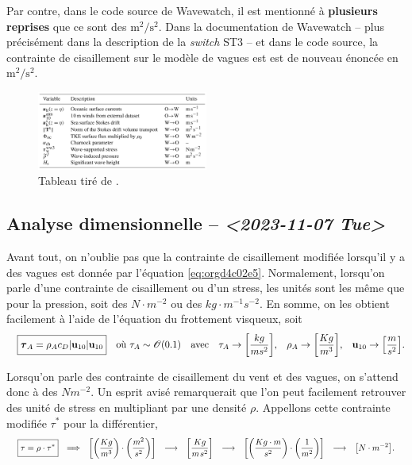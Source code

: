 \documentclass[10pt]{article}
\numberwithin{equation}{section}
\newcommand{\uu}{\vb{u}}
\newcommand{\tall}{\vphantom{pA^{x^x}_p}}
\newcommand{\pt}{\hspace{1pt}} %
\begin{document}
Par contre, dans le code source de Wavewatch, il est mentionné à \textbf{plusieurs reprises} que ce sont des \(\mathrm{m}^2/\mathrm{s}^2\).
Dans la documentation de Wavewatch -- plus précisément dans la description de la \emph{switch} ST3 -- et dans le code source, la contrainte de cisaillement sur le modèle de vagues est est de nouveau énoncée en \(\mathrm{m}^2/\mathrm{s}^2\).

\begin{figure}[ht]
\centering
\includegraphics[width=0.5\textwidth]{figures/articles/gmd-13-3067-2020-t01-web.png}
\caption{\label{fig:orgd2d9b57}Tableau tiré de \textcite{couvelard2020development}.}
\end{figure}


\subsection{Analyse dimensionnelle -- \textit{<2023-11-07 Tue>}}
\label{sec:org4b812a5}
\label{org28e3abc}

Avant tout, on n'oublie pas que la contrainte de cisaillement modifiée lorsqu'il y a des vagues est donnée par l'équation \ref{eq:orgd4c02e5}. 
Normalement, lorsqu'on parle d'une contrainte de cisaillement ou d'un stress, les unités sont les même que pour la pression, soit des \(N\cdot m^{-2}\) ou des \(kg\cdot m^{-1}s^{-2}\).
En somme, on les obtient facilement à l'aide de l'équation du frottement visqueux, soit
\begin{align}
   && \boxed{\boldsymbol{\tau}_{A} = \rho_A c_D \abs{\uu_{10}} \uu_{10}\tall }
   && \text{où}\  \tau_A \sim \mathscr{O}\qty(0.1)
   && \text{avec}
   && \tau_A \rightarrow \qty[\frac{kg}{ms^2}],
   && \rho_A \rightarrow \qty[\frac{Kg}{m^3}],
   && \uu_{10} \rightarrow \qty[\frac{m}{s^2}].
\end{align}

Lorsqu'on parle des contrainte de cisaillement du vent et des vagues, on s'attend donc à des \(N m^{-2}\).
Un esprit avisé remarquerait que l'on peut facilement retrouver des unité de stress en multipliant par une densité \(\rho\).
Appellons cette contrainte modifiée \(\tau^*\) pour la différentier,
\begin{align}
   && \boxed{\tau = \rho \cdot \tau^*\tall}
   &&\Longrightarrow
   &&\qty[\qty(\frac{Kg}{m^3})\cdot \qty(\frac{m^2}{s^2})]
   &&\longrightarrow
   &&\qty[ \frac{Kg}{m\pt s^2} ]
   &&\longrightarrow
   &&\qty[\qty(\frac{Kg\cdot m}{s^2})\cdot \qty(\frac{1}{m^2})]
   &&\longrightarrow
   &&\qty[N \cdot m^{-2}]. &&
\end{align}
\end{document}
